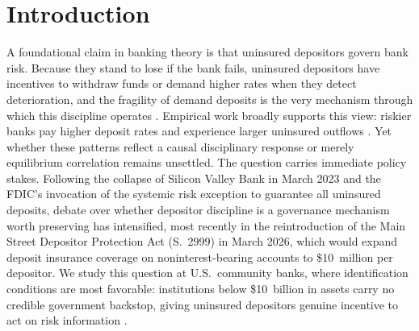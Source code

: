 
\section{Introduction}
\label{sec:intro}

A foundational claim in banking theory is that uninsured depositors govern bank
risk.  Because they stand to lose if the bank fails, uninsured depositors have
incentives to withdraw funds or demand higher rates when they detect
deterioration, and the fragility of demand deposits is the very mechanism through
which this discipline operates \citep{calomiris1991role, diamond2001liquidity}.
Empirical work broadly supports this view: riskier banks pay higher deposit rates
and experience larger uninsured outflows
\citep{park1995market, martinez2001depositors, maechler2006dynamic, iyer2016tale,
egan2017deposit}.  Yet whether these patterns reflect a causal disciplinary
response or merely equilibrium correlation remains unsettled.  The question
carries immediate policy stakes.  Following the collapse of Silicon Valley Bank
in March 2023 and the FDIC's invocation of the systemic risk exception to
guarantee all uninsured deposits, debate over whether depositor discipline is a
governance mechanism worth preserving has intensified, most recently in the
reintroduction of the Main Street Depositor Protection Act (S.~2999) in March
2026, which would expand deposit insurance coverage on noninterest-bearing
accounts to \$10~million per depositor.  We study this question at U.S.\
community banks, where identification conditions are most favorable: institutions
below \$10~billion in assets carry no credible government backstop, giving
uninsured depositors genuine incentive to act on risk information
\citep{o1990deposit, flannery1996evidence}.

